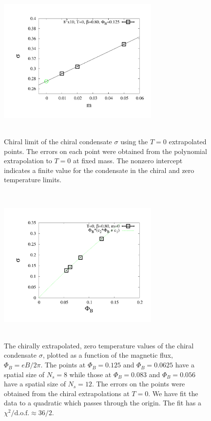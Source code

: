 \documentclass[aps,prd,twocolumn,showpacs,superscriptaddress,groupedaddress]{revtex4}  %
\begin{document}
\begin{figure}
  \includegraphics[height=8cm,width=8cm]{pbp_vs_m_zeroT_PHI0125_lin_graphene_paper.pdf} \hspace{-1cm}
\caption{Chiral limit of the chiral condensate $\sigma$ using the $T=0$ extrapolated points. The errors on each point were obtained from the polynomial extrapolation to $T=0$ at fixed mass. The nonzero intercept indicates a finite value for the condensate in the chiral and zero temperature limits.}
\label{PBPzeroTChiral}
\end{figure}

\begin{figure}
 \includegraphics[height=8cm,width=8cm]{pbp_vs_PHI_NL_graphene_paper.pdf} \hspace{-1cm}
\caption{The chirally extrapolated, zero temperature values of the chiral condensate $\sigma$, plotted as a function of the magnetic flux,  $\Phi_B = eB/2\pi$.  The points at $\Phi_B=0.125$ and $\Phi_B=0.0625$ have a spatial size of $N_s=8$ while those at $\Phi_B=0.083$ and $\Phi_B=0.056$ have a spatial size of $N_s=12$. The errors on the points were obtained from the chiral extrapolations at $T=0$. We have fit the data to a quadratic which passes through the origin. The fit has a $\chi^2/\text{d.o.f.} \approx 36/2$. } 
\label{PBPzeroTChiralvseB}
\end{figure}
\end{document}
